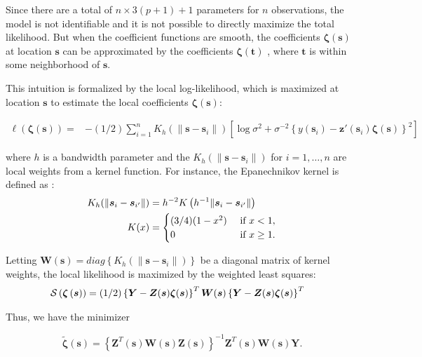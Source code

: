 \documentclass[english]{article}\usepackage[]{graphicx}\usepackage[]{color}
\theoremstyle{plain}
\theoremstyle{plain}
\begin{document}
Since there are a total of $n\times3(p+1)+1$ parameters for $n$
observations, the model is not identifiable and it is not possible
to directly maximize the total likelihood. But when the coefficient
functions are smooth, the coefficients $\bm{\zeta}\left(\bm{s}\right)$
at location $\bm{s}$ can be approximated by the coefficients $\bm{\zeta}\left(\bm{t}\right)$
, where $\bm{t}$ is within some neighborhood of $\bm{s}$.

This intuition is formalized by the local log-likelihood, which is
maximized at location $\bm{s}$ to estimate the local coefficients
$\bm{\zeta}(\bm{s})$:

\begin{align}
\ell\left(\bm{\zeta}(\bm{s})\right)= & -(1/2)\sum_{i=1}^{n}K_{h}(\|\bm{s}-\bm{s}_{i}\|)\left[\log\sigma^{2}+\sigma^{-2}\left\{ y\left(\bm{s}_{i}\right)-\bm{z}'\left(\bm{s}_{i}\right)\bm{\zeta}\left(\bm{s}\right)\right\} ^{2}\right]\label{eq:local-log-likelihood}
\end{align}


where $h$ is a bandwidth parameter and the $K_{h}\left(\|\bm{s}-\bm{s}_{i}\|\right)$
for $i=1,\dots,n$ are local weights from a kernel function. For instance,
the Epanechnikov kernel is defined as \citep{Samiuddin-el-Sayyad-1990}:
\begin{align}
K_{h}(\|\bm{s}_{i}-\bm{s}_{i'}\|) & =h^{-2}K\left(h^{-1}\|\bm{s}_{i}-\bm{s}_{i'}\|\right)\notag\label{eq:epanechnikov}\\
K(x) & =\begin{cases}
(3/4)(1-x^{2}) & \mbox{ if }x<1,\\
0 & \mbox{ if }x\geq1.
\end{cases}
\end{align}


Letting $\bm{W}(\bm{s})=diag\left\{ K_{h}(\|\bm{s}-\bm{s}_{i}\|)\right\} $
be a diagonal matrix of kernel weights, the local likelihood is maximized
by the weighted least squares: 
\begin{align}
\mathcal{S}\left(\bm{\zeta}\left(\bm{s}\right)\right) & =(1/2)\left\{ \bm{Y}-\bm{Z}(\bm{s})\bm{\zeta}(\bm{s})\right\} ^{T}\bm{W}(\bm{s})\left\{ \bm{Y}-\bm{Z}(\bm{s})\bm{\zeta}(\bm{s})\right\} ^{T}\notag\label{eq:zeta-hat}
\end{align}


Thus, we have the minimizer

\begin{equation}
\tilde{\bm{\zeta}}(\bm{s})=\left\{ \bm{Z}^{T}(\bm{s})\bm{W}(\bm{s})\bm{Z}(\bm{s})\right\} ^{-1}\bm{Z}^{T}(\bm{s})\bm{W}(\bm{s})\bm{Y}.\label{eq:zeta-hat-1}
\end{equation}
\end{document}
